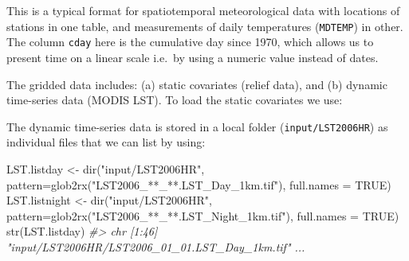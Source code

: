 \documentclass[
  graybox,natbib,nospthms]{svmono}
\newenvironment{Shaded}{\begin{snugshade}}{\end{snugshade}}
\newcommand{\AttributeTok}[1]{\textcolor[rgb]{0.61,0.61,0.61}{#1}}
\newcommand{\CommentTok}[1]{\textcolor[rgb]{0.37,0.37,0.37}{\textit{#1}}}
\newcommand{\ConstantTok}[1]{\textcolor[rgb]{0,0,0}{#1}}
\newcommand{\FunctionTok}[1]{\textcolor[rgb]{0,0,0}{#1}}
\newcommand{\NormalTok}[1]{#1}
\newcommand{\OtherTok}[1]{\textcolor[rgb]{0.37,0.37,0.37}{#1}}
\newcommand{\SpecialCharTok}[1]{\textcolor[rgb]{0,0,0}{#1}}
\newcommand{\StringTok}[1]{\textcolor[rgb]{0.5,0.5,0.5}{#1}}
\begin{document}
This is a typical format for spatiotemporal meteorological data with locations
of stations in one table, and measurements of daily temperatures (\texttt{MDTEMP}) in
other. The column \texttt{cday} here is the cumulative day since 1970, which allows us
to present time on a linear scale i.e.~by using a numeric value instead of dates.

The gridded data includes: (a) static covariates (relief data), and
(b) dynamic time-series data (MODIS LST). To load the static covariates we use:

\begin{Shaded}
\end{Shaded}

The dynamic time-series data is stored in a local folder (\texttt{input/LST2006HR}) as
individual files that we can list by using:

\begin{Shaded}
\begin{Highlighting}[]
\NormalTok{LST.listday }\OtherTok{\textless{}{-}} \FunctionTok{dir}\NormalTok{(}\StringTok{"input/LST2006HR"}\NormalTok{, }\AttributeTok{pattern=}\FunctionTok{glob2rx}\NormalTok{(}\StringTok{"LST2006\_**\_**.LST\_Day\_1km.tif"}\NormalTok{), }\AttributeTok{full.names =} \ConstantTok{TRUE}\NormalTok{)}
\NormalTok{LST.listnight }\OtherTok{\textless{}{-}} \FunctionTok{dir}\NormalTok{(}\StringTok{"input/LST2006HR"}\NormalTok{, }\AttributeTok{pattern=}\FunctionTok{glob2rx}\NormalTok{(}\StringTok{"LST2006\_**\_**.LST\_Night\_1km.tif"}\NormalTok{), }\AttributeTok{full.names =} \ConstantTok{TRUE}\NormalTok{)}
\FunctionTok{str}\NormalTok{(LST.listday)}
\CommentTok{\#\textgreater{}  chr [1:46] "input/LST2006HR/LST2006\_01\_01.LST\_Day\_1km.tif" ...}
\end{Highlighting}
\end{Shaded}
\end{document}
